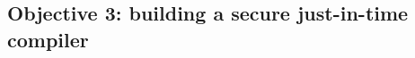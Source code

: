 


\vspace{-.15in}\subsection{Objective 3: building a 
secure just-in-time compiler}\label{sec:obj3}\vspace{-.075in}


